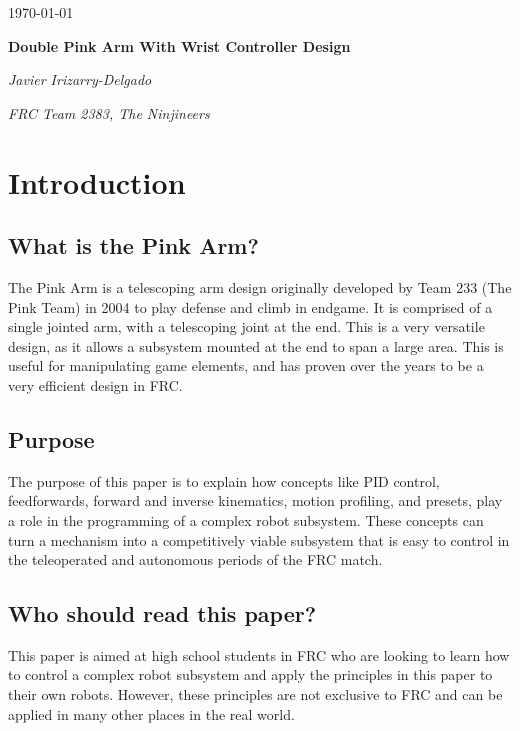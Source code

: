 \documentclass{scrartcl}
\begin{document}
\begin{titlepage}
    \centering
    {\large \today\par}
    \vfill

    {\huge\bfseries Double Pink Arm With Wrist Controller Design\par}
    \vfill

    {\Large\itshape Javier Irizarry-Delgado}\par
    {\itshape FRC Team 2383, The Ninjineers}\par
    \vspace{1.5cm}

    \vfill
\end{titlepage}

\newpage

\doublespacing
\tableofcontents
\singlespacing
\newpage
\doublespacing
\section{Introduction}
\subsection{What is the Pink Arm?}
The Pink Arm is a telescoping arm design originally developed by Team 233 (The Pink Team) in 2004 to play defense and climb in endgame. It is comprised of a single jointed arm, with a telescoping joint at the end. This is a very versatile design, as it allows a subsystem mounted at the end to span a large area. This is useful for manipulating game elements, and has proven over the years to be a very efficient design in FRC.

\subsection{Purpose}
The purpose of this paper is to explain how concepts like PID control, feedforwards, forward and inverse kinematics, motion profiling, and presets, play a role in the programming of a complex robot subsystem. These concepts can turn a mechanism into a competitively viable subsystem that is easy to control in the teleoperated and autonomous periods of the FRC match.

\subsection{Who should read this paper?}
This paper is aimed at high school students in FRC who are looking to learn how to control a complex robot subsystem and apply the principles in this paper to their own robots. However, these principles are not exclusive to FRC and can be applied in many other places in the real world.
\end{document}

